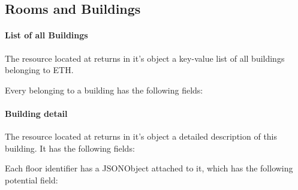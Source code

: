 \subsection{Rooms and Buildings}

\paragraph{List of all Buildings}
\label{net:building:list}
The resource located at  returns in it's  object a key-value list of all buildings belonging to ETH.
\begin{description}
\end{description}
Every  belonging to a building has the following fields:
\begin{description}
\end{description}

\paragraph{Building detail}
The resource located at  returns in it's  object a detailed description of this building. It has the following fields:
\begin{description}
\end{description}
Each floor identifier has a JSONObject attached to it, which has the following potential field:
\begin{description}
\end{description}

